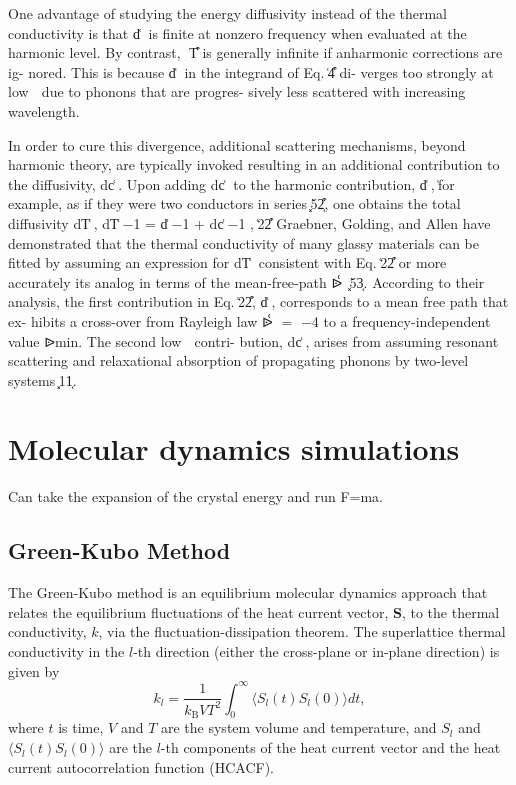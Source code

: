 \documentclass[letterpaper,12pt]{article}
\begin{document}
One advantage of studying the energy diffusivity instead
of the thermal conductivity is that d͑␻͒ is finite at nonzero
frequency when evaluated at the harmonic level. By contrast,
␬͑T͒ is generally infinite if anharmonic corrections are ig-
nored. This is because d͑␻͒ in the integrand of Eq. ͑4͒ di-
verges too strongly at low ␻ due to phonons that are progres-
sively less scattered with increasing wavelength. \cite{PhysRevB.34.5696}

In order to cure this divergence, additional scattering
mechanisms, beyond harmonic theory, are typically invoked
resulting in an additional contribution to the diffusivity,
dc͑␻͒. Upon adding dc͑␻͒ to the harmonic contribution,
d͑␻͒, ͑for example, as if they were two conductors in series
͓52͔͒, one obtains the total diffusivity dT͑␻͒,
dT͑␻͒−1 = d͑␻͒−1 + dc͑␻͒−1 ,
͑22͒
Graebner, Golding, and Allen have demonstrated that the
thermal conductivity of many glassy materials can be fitted
by assuming an expression for dT͑␻͒ consistent with Eq. ͑22͒
or more accurately its analog in terms of the mean-free-path
ᐉ͑␻͒ ͓53͔. According to their analysis, the first contribution
in Eq. ͑22͒, d͑␻͒, corresponds to a mean free path that ex-
hibits a cross-over from Rayleigh law ᐉ͑␻͒ = ␻−4 to a
frequency-independent value ᐉmin. The second low ␻ contri-
bution, dc͑␻͒, arises from assuming resonant scattering and
relaxational absorption of propagating phonons by two-level
systems ͓11͔.

\cite{PhysRevB.34.5696}

\section{\label{S-MD}Molecular dynamics simulations}

Can take the expansion of the crystal energy and run F=ma.

\subsection{\label{S:Intro-Objectives}Green-Kubo Method}

The Green-Kubo method is an equilibrium molecular dynamics approach
that relates the equilibrium fluctuations of the heat current
vector, \textbf{S}, to the thermal conductivity, $k$, via the
fluctuation-dissipation theorem. The superlattice thermal
conductivity in the $l$-th direction (either the cross-plane or
in-plane direction) is given by \cite{mcquarrie}
\begin{equation}
k_l=\frac{1}{k_{\mathrm{B}}VT^2}\int_0^{\infty}\langle S_l(t)S_l(0)
\rangle dt, \label{E-GK}
\end{equation}
where $t$ is time, $V$ and $T$ are the system volume and
temperature, and $S_l$ and $\langle S_l(t)S_l(0) \rangle$ are the
$l$-th components of the heat current vector and the heat current
autocorrelation function (HCACF).
\end{document}
